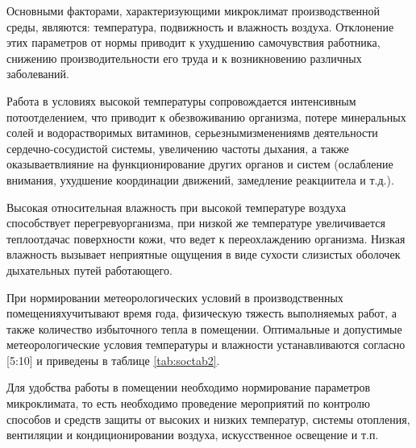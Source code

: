 Основными     факторами,     характеризующими     микроклимат производственной среды, являются: температура, подвижность и влажность воздуха.  Отклонение  этих  параметров  от  нормы приводит  к  ухудшению самочувствия  работника,  снижению  производительности  его  труда  и  к возникновению различных заболеваний.

Работа в условиях высокой температуры сопровождается интенсивным потоотделением,  что  приводит  к обезвоживанию  организма,  потере минеральных солей и водорастворимых витаминов, серьезнымизменениямв деятельности сердечно-сосудистой системы, увеличению частоты дыхания, а также  оказываетвлияние  на  функционирование  других  органов  и  систем (ослабление  внимания,  ухудшение  координации  движений,  замедление реакциитела и т.д.). 

Высокая  относительная  влажность при  высокой  температуре  воздуха способствует   перегревуорганизма,   при   низкой   же   температуре увеличивается теплоотдачас поверхности кожи, что ведет к переохлаждению организма. Низкая  влажность вызывает  неприятные  ощущения  в  виде сухости слизистых оболочек дыхательных путей работающего.

При  нормировании метеорологических  условий  в  производственных помещенияхучитывают  время  года,  физическую  тяжесть  выполняемых работ, а также количество избыточного тепла в помещении. Оптимальные и допустимые   метеорологические   условия   температуры   и   влажности устанавливаются согласно [5:10] и приведены в таблице \ref{tab:soctab2}.

Для  удобства  работы  в  помещении  необходимо  нормирование параметров микроклимата, то есть необходимо проведение мероприятий по контролю  способов  и  средств  защиты  от  высоких  и  низких  температур, системы   отопления, вентиляции   и   кондиционировании   воздуха, искусственное освещение и т.п.

